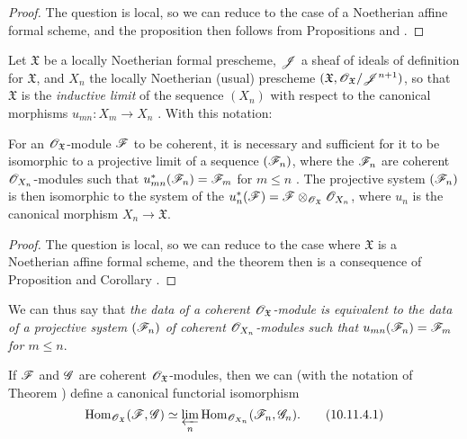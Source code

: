 \begin{proof}
The question is local, so we can reduce to the case of a Noetherian affine formal scheme, and the proposition then follows from Propositions  and .
\end{proof}

\begin{env}[10.11.2]
\label{I.10.11.2}
Let $\mathfrak{X}$ be a locally Noetherian formal prescheme, $\mathscr{J}$ a sheaf of ideals of definition for $\mathfrak{X}$, and $X_n$ the locally Noetherian (usual) prescheme $(\mathfrak{X},\mathscr{O}_\mathfrak{X}/\mathscr{J}^{n+1})$, so that $\mathfrak{X}$ is the \emph{inductive limit} of the sequence $(X_n)$ with respect to the canonical morphisms $u_{mn}:X_m\to X_n$ .
With this notation:
\end{env}

\begin{theorem}[10.11.3]
\label{I.10.11.3}
For an $\mathscr{O}_\mathfrak{X}$-module $\mathscr{F}$ to be coherent, it is necessary and sufficient for it to be isomorphic to a projective limit of a sequence $(\mathscr{F}_n)$, where the $\mathscr{F}_n$ are coherent $\mathscr{O}_{X_n}$-modules such that $u_{mn}^*(\mathscr{F}_n)=\mathscr{F}_m$ for $m\leq n$ .
The projective system $(\mathscr{F}_n)$ is then isomorphic to the system of the $u_n^*(\mathscr{F})=\mathscr{F}\otimes_{\mathscr{O}_\mathfrak{X}}\mathscr{O}_{X_n}$, where $u_n$ is the canonical morphism $X_n\to\mathfrak{X}$.
\end{theorem}

\begin{proof}
The question is local, so we can reduce to the case where $\mathfrak{X}$ is a Noetherian affine formal scheme, and the theorem then is a consequence of Proposition  and Corollary .
\end{proof}

We can thus say that \emph{the data of a coherent $\mathscr{O}_\mathfrak{X}$-module is equivalent to the data of a projective system $(\mathscr{F}_n)$ of coherent $\mathscr{O}_{X_n}$-modules such that $u_{mn}(\mathscr{F}_n)=\mathscr{F}_m$ for $m\leq n$}.

\begin{corollary}[10.11.4]
\label{I.10.11.4}
If $\mathscr{F}$ and $\mathscr{G}$ are coherent $\mathscr{O}_\mathfrak{X}$-modules, then we can (with the notation of Theorem ) define a canonical functorial isomorphism
\[
\label{I.10.11.4.1}
  \operatorname{Hom}_{\mathscr{O}_\mathfrak{X}}(\mathscr{F},\mathscr{G})\simeq\varprojlim_n\operatorname{Hom}_{\mathscr{O}_{X_n}}(\mathscr{F}_n,\mathscr{G}_n).
  \tag{10.11.4.1}
\]
\end{corollary}

